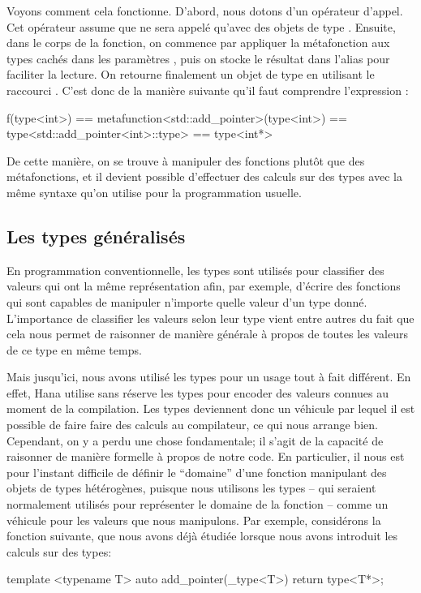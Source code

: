 Voyons comment cela fonctionne. D'abord, nous dotons 
d'un opérateur d'appel. Cet opérateur assume que  ne
sera appelé qu'avec des objets de type . Ensuite, dans le corps
de la fonction, on commence par appliquer la métafonction  aux types
 cachés dans les paramètres , puis on stocke le
résultat dans l'alias  pour faciliter la lecture. On retourne
finalement un objet de type  en utilisant le raccourci
. C'est donc de la manière suivante qu'il faut comprendre
l'expression :
\begin{cpp}
    f(type<int>) == metafunction<std::add_pointer>(type<int>)
                 == type<std::add_pointer<int>::type>
                 == type<int*>
\end{cpp}

De cette manière, on se trouve à manipuler des fonctions plutôt que des
métafonctions, et il devient possible d'effectuer des calculs sur des types
avec la même syntaxe qu'on utilise pour la programmation usuelle.


\subsection{Les types généralisés}
En programmation conventionnelle, les types sont utilisés pour classifier
des valeurs qui ont la même représentation afin, par exemple, d'écrire
des fonctions qui sont capables de manipuler n'importe quelle valeur
d'un type donné. L'importance de classifier les valeurs selon leur type
vient entre autres du fait que cela nous permet de raisonner de manière
générale à propos de toutes les valeurs de ce type en même temps.

Mais jusqu'ici, nous avons utilisé les types pour un usage tout à fait
différent. En effet, Hana utilise sans réserve les types pour encoder des
valeurs connues au moment de la compilation. Les types deviennent donc un
véhicule par lequel il est possible de faire faire des calculs au compilateur,
ce qui nous arrange bien. Cependant, on y a perdu une chose fondamentale; il
s'agit de la capacité de raisonner de manière formelle à propos de notre code.
En particulier, il nous est pour l'instant difficile de définir le ``domaine''
d'une fonction manipulant des objets de types hétérogènes, puisque nous
utilisons les types -- qui seraient normalement utilisés pour représenter le
domaine de la fonction -- comme un véhicule pour les valeurs que nous
manipulons. Par exemple, considérons la fonction suivante, que nous avons
déjà étudiée lorsque nous avons introduit les calculs sur des types:
\begin{cpp}
    template <typename T>
    auto add_pointer(_type<T>) {
        return type<T*>;
    }
\end{cpp}

